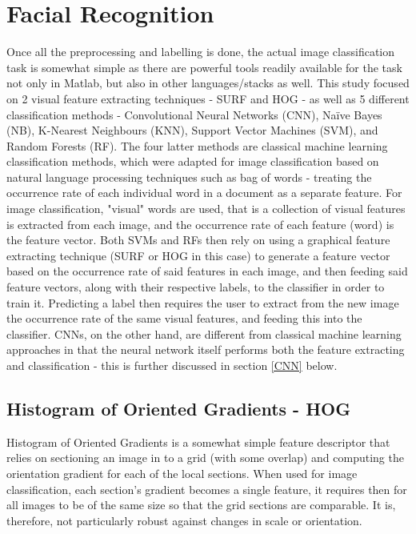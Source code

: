 \documentclass[11pt]{article}
\begin{document}
\section{Facial Recognition}
    Once all the preprocessing and labelling is done, the actual image classification task is somewhat simple as there are powerful tools readily available for the task not only in Matlab, but also in other languages/stacks as well. This study focused on 2 visual feature extracting techniques - SURF and HOG - as well as 5 different classification methods - Convolutional Neural Networks (CNN), Naïve Bayes (NB), K-Nearest Neighbours (KNN), Support Vector Machines (SVM), and Random Forests (RF). The four latter methods are classical machine learning classification methods, which were adapted for image classification based on natural language processing techniques such as bag of words - treating the occurrence rate of each individual word in a document as a separate feature. For image classification, "visual" words are used, that is a collection of visual features is extracted from each image, and the occurrence rate of each feature (word) is the feature vector. Both SVMs and RFs then rely on using a graphical feature extracting technique (SURF or HOG in this case) to generate a feature vector based on the occurrence rate of said features in each image, and then feeding said feature vectors, along with their respective labels, to the classifier in order to train it. Predicting a label then requires the user to extract from the new image the occurrence rate of the same visual features, and feeding this into the classifier. CNNs, on the other hand, are different from classical machine learning approaches in that the neural network itself performs both the feature extracting and classification - this is further discussed in section \ref{CNN} below.

    \subsection{Histogram of Oriented Gradients - HOG}
        Histogram of Oriented Gradients is a somewhat simple feature descriptor that relies on sectioning an image in to a grid (with some overlap) and computing the orientation gradient for each of the local sections. When used for image classification, each section's gradient becomes a single feature, it requires then for all images to be of the same size so that the grid sections are comparable. It is, therefore, not particularly robust against changes in scale or orientation.
\end{document}
